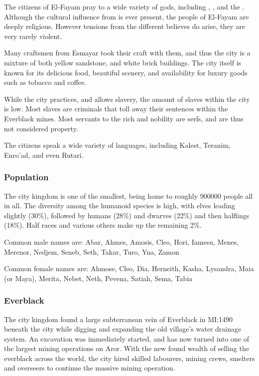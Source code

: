 The citizens of El-Fayam pray to a wide variety of gods, including
, ,  and the
. Although the cultural influence from  is ever present, the people of El-Fayam are deeply
religious. However tensions from the different believes do arise, they are
very rarely violent.

Many craftsmen from Esmayar took their craft with them, and thus the city is a
mixture of both yellow sandstone, and white brick buildings. The city itself
is known for its delicious food, beautiful scenery, and availability for
luxury goods such as tobacco and coffee.

While the city practices, and allows slavery, the amount of slaves within the
city is low. Most slaves are criminals that toll away their sentences within
the Everblack mines. Most servants to the rich and nobility are serfs, and are
thus not considered property.

The citizens speak a wide variety of languages, including Kalest, Teranim,
Enro'ad, and even Rutari.

\subsubsection{Population}

The city kingdom is one of the smallest, being home to roughly 900000
people all in all. The diversity among the humanoid species is high, with
elves leading slightly (30\%), followed by humans (28\%) and dwarves (22\%)
and then halflings (18\%). Half races and various others make up the remaining
2\%.

Common male names are: Abar, Ahmes, Amosis, Cleo, Hori, Iamesu, Menes,
Merenor, Nedjem, Seneb, Seth, Takar, Turo, Yna, Zamon

Common female names are: Ahmose, Cleo, Dia, Herneith, Kasha, Lysandra, Maia
(or Maya), Merita, Nebet, Neth, Pevena, Satiah, Sema, Tabia

\subsubsection{Everblack}

The city kingdom found a large subterranean vein of Everblack in MI:1490
beneath the city while digging and expanding the old village's water drainage
system. An excavation was immediately started, and has now turned into one of
the largest mining operations on Aror. With the new found wealth of selling
the everblack across the world, the city hired skilled labourers, mining
crews, smelters and overseers to continue the massive mining operation.

